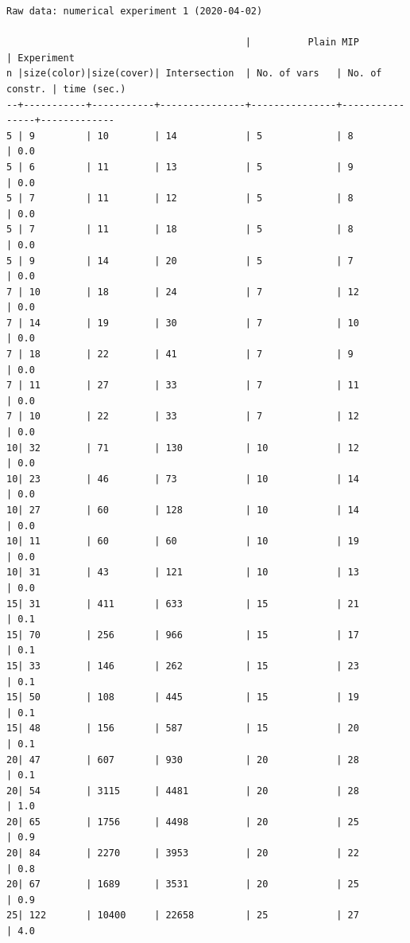 \documentclass[11pt]{article}
\begin{document}
\begin{listing}[htbp]
\begin{verbatim}
Raw data: numerical experiment 1 (2020-04-02)
    
                                          |          Plain MIP             | Experiment
n |size(color)|size(cover)| Intersection  | No. of vars   | No. of constr. | time (sec.)
--+-----------+-----------+---------------+---------------+----------------+-------------
5 | 9         | 10        | 14            | 5             | 8              | 0.0
5 | 6         | 11        | 13            | 5             | 9              | 0.0
5 | 7         | 11        | 12            | 5             | 8              | 0.0
5 | 7         | 11        | 18            | 5             | 8              | 0.0
5 | 9         | 14        | 20            | 5             | 7              | 0.0
7 | 10        | 18        | 24            | 7             | 12             | 0.0
7 | 14        | 19        | 30            | 7             | 10             | 0.0
7 | 18        | 22        | 41            | 7             | 9              | 0.0
7 | 11        | 27        | 33            | 7             | 11             | 0.0
7 | 10        | 22        | 33            | 7             | 12             | 0.0
10| 32        | 71        | 130           | 10            | 12             | 0.0
10| 23        | 46        | 73            | 10            | 14             | 0.0
10| 27        | 60        | 128           | 10            | 14             | 0.0
10| 11        | 60        | 60            | 10            | 19             | 0.0
10| 31        | 43        | 121           | 10            | 13             | 0.0
15| 31        | 411       | 633           | 15            | 21             | 0.1
15| 70        | 256       | 966           | 15            | 17             | 0.1
15| 33        | 146       | 262           | 15            | 23             | 0.1
15| 50        | 108       | 445           | 15            | 19             | 0.1
15| 48        | 156       | 587           | 15            | 20             | 0.1
20| 47        | 607       | 930           | 20            | 28             | 0.1
20| 54        | 3115      | 4481          | 20            | 28             | 1.0
20| 65        | 1756      | 4498          | 20            | 25             | 0.9
20| 84        | 2270      | 3953          | 20            | 22             | 0.8
20| 67        | 1689      | 3531          | 20            | 25             | 0.9
25| 122       | 10400     | 22658         | 25            | 27             | 4.0

\end{verbatim}
\end{listing}
\end{document}
